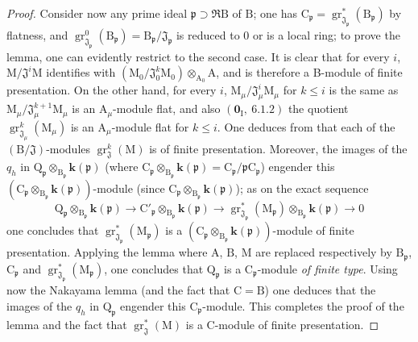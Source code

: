 \begin{proof}
Consider now any prime ideal $\mathfrak{p}\supset\mathfrak{R}\mathrm{B}$ of $\mathrm{B}$; one has $\mathrm{C}_\mathfrak{p}=\operatorname{gr}^*_{\mathfrak{J}_\mathfrak{p}}(\mathrm{B}_\mathfrak{p})$ by flatness, and $\operatorname{gr}^0_{\mathfrak{J}_\mathfrak{p}}(\mathrm{B}_\mathfrak{p})=\mathrm{B}_\mathfrak{p}/\mathfrak{J}_\mathfrak{p}$ is reduced to $0$ or is a local ring; to prove the lemma, one can evidently restrict to the second case. It is clear that for every $i$, $\mathrm{M}/\mathfrak{J}^i\mathrm{M}$ identifies with $(\mathrm{M}_0/\mathfrak{J}^k_0\mathrm{M}_0)\otimes_{\mathrm{A}_0}\mathrm{A}$, and is therefore a B-module of finite presentation. On the other hand, for every $i$, $\mathrm{M}_\mu/\mathfrak{J}^i_\mu\mathrm{M}_\mu$ for $k\leqslant i$ is the same as $\mathrm{M}_\mu/\mathfrak{J}^{k+1}_\mu\mathrm{M}_\mu$ is an $\mathrm{A}_\mu$-module flat, and also $(\mathbf{0}_\mathrm{I},~6.1.2)$ the quotient $\operatorname{gr}^k_{\mathfrak{J}_\mu}(\mathrm{M}_\mu)$ is an $\mathrm{A}_\mu$-module flat for $k\leqslant i$. One deduces from  that each of the $(\mathrm{B}/\mathfrak{J})$-modules $\operatorname{gr}^k_\mathfrak{J}(\mathrm{M})$ is of finite presentation. Moreover, the images of the $q_h$ in $\mathrm{Q}_\mathfrak{p}\otimes_{\mathrm{B}_\mathfrak{p}}\boldsymbol{k}(\mathfrak{p})$ (where $\mathrm{C}_\mathfrak{p}\otimes_{\mathrm{B}_\mathfrak{p}}\boldsymbol{k}(\mathfrak{p})=\mathrm{C}_\mathfrak{p}/\mathfrak{p}\mathrm{C}_\mathfrak{p}$) engender this $(\mathrm{C}_\mathfrak{p}\otimes_{\mathrm{B}_\mathfrak{p}}\boldsymbol{k}(\mathfrak{p}))$-module (since $\mathrm{C}_\mathfrak{p}\otimes_{\mathrm{B}_\mathfrak{p}}\boldsymbol{k}(\mathfrak{p})$); as on the exact sequence
\[
  \mathrm{Q}_\mathfrak{p}\otimes_{\mathrm{B}_\mathfrak{p}}\boldsymbol{k}(\mathfrak{p})\to\mathrm{C}'_\mathfrak{p}\otimes_{\mathrm{B}_\mathfrak{p}}\boldsymbol{k}(\mathfrak{p})\to\operatorname{gr}^*_{\mathfrak{J}_\mathfrak{p}}(\mathrm{M}_\mathfrak{p})\otimes_{\mathrm{B}_\mathfrak{p}}\boldsymbol{k}(\mathfrak{p})\to 0
\]
one concludes that $\operatorname{gr}^*_{\mathfrak{J}_\mathfrak{p}}(\mathrm{M}_\mathfrak{p})$ is a $(\mathrm{C}_\mathfrak{p}\otimes_{\mathrm{B}_\mathfrak{p}}\boldsymbol{k}(\mathfrak{p}))$-module of finite presentation. Applying the lemma  where $\mathrm{A}$, $\mathrm{B}$, $\mathrm{M}$ are replaced respectively by $\mathrm{B}_\mathfrak{p}$, $\mathrm{C}_\mathfrak{p}$ and $\operatorname{gr}^*_{\mathfrak{J}_\mathfrak{p}}(\mathrm{M}_\mathfrak{p})$, one concludes that $\mathrm{Q}_\mathfrak{p}$ is a $\mathrm{C}_\mathfrak{p}$-module \emph{of finite type}. Using now the Nakayama lemma (and the fact that $\mathrm{C}=\mathrm{B}$) one deduces that the images of the $q_h$ in $\mathrm{Q}_\mathfrak{p}$ engender this $\mathrm{C}_\mathfrak{p}$-module. This completes the proof of the lemma  and the fact that $\operatorname{gr}^*_\mathfrak{J}(\mathrm{M})$ is a C-module of finite presentation.


\end{proof}
